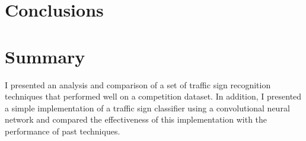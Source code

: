 \documentclass[letterpaper,twocolumn,10pt]{article}
\begin{document}
\section{Conclusions}


\section{Summary}

I presented an analysis and comparison of a set of traffic sign recognition techniques that performed well on a competition dataset. In addition, I presented a simple implementation of a traffic sign classifier using a convolutional neural network and compared the effectiveness of this implementation with the performance of past techniques.


{\footnotesize 
}
\end{document}

